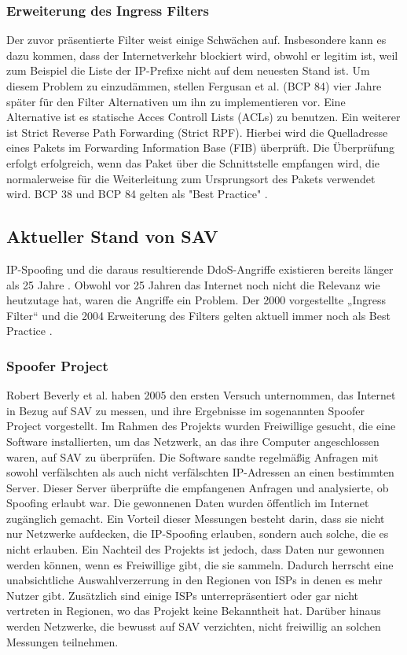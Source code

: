 \documentclass[sigplan,screen]{acmart}
\begin{document}
\subsubsection{Erweiterung des Ingress Filters}
Der zuvor präsentierte Filter weist einige Schwächen auf. Insbesondere kann es dazu kommen, dass der Internetverkehr blockiert wird, obwohl er legitim ist, weil zum Beispiel die Liste der IP-Prefixe nicht auf dem neuesten Stand ist. Um diesem Problem zu einzudämmen, stellen Fergusan et al. (BCP 84) \cite{Bcp84} vier Jahre später für den Filter Alternativen um ihn zu implementieren vor. Eine Alternative ist es statische Acces Controll Lists (ACLs) zu benutzen. Ein weiterer ist Strict Reverse Path Forwarding (Strict RPF). Hierbei wird die Quelladresse eines Pakets im Forwarding Information Base (FIB) überprüft. Die Überprüfung erfolgt erfolgreich, wenn das Paket über die Schnittstelle empfangen wird, die normalerweise für die Weiterleitung zum Ursprungsort des Pakets verwendet wird. BCP 38 und BCP 84 gelten als "Best Practice" \cite{Hal01}.

\subsection{Aktueller Stand von SAV}
IP-Spoofing und die daraus resultierende DdoS-Angriffe existieren bereits länger als 25 Jahre \cite{manrs01}. Obwohl vor 25 Jahren das Internet noch nicht die Relevanz wie heutzutage hat, waren die Angriffe ein Problem. Der 2000 vorgestellte „Ingress Filter“ \cite{Ingress01} und die 2004 Erweiterung des Filters \cite{Bcp84} gelten aktuell immer noch als Best Practice \cite{CRP01} \cite{Lone01} \cite{Hal01} \cite{manrs01}.  

\subsubsection{Spoofer Project}
Robert Beverly et al. \cite{Spoofer01} haben 2005 den ersten Versuch unternommen, das Internet in Bezug auf SAV zu messen, und ihre Ergebnisse im sogenannten Spoofer Project vorgestellt. Im Rahmen des Projekts wurden Freiwillige gesucht, die eine Software installierten, um das Netzwerk, an das ihre Computer angeschlossen waren, auf SAV zu überprüfen. Die Software sandte regelmäßig Anfragen mit sowohl verfälschten als auch nicht verfälschten IP-Adressen an einen bestimmten Server. Dieser Server überprüfte die empfangenen Anfragen und analysierte, ob Spoofing erlaubt war. Die gewonnenen Daten wurden öffentlich im Internet zugänglich gemacht. Ein Vorteil dieser Messungen besteht darin, dass sie nicht nur Netzwerke aufdecken, die IP-Spoofing erlauben, sondern auch solche, die es nicht erlauben. Ein Nachteil des Projekts ist jedoch, dass Daten nur gewonnen werden können, wenn es Freiwillige gibt, die sie sammeln. Dadurch herrscht eine unabsichtliche Auswahlverzerrung in den Regionen von ISPs in denen es mehr Nutzer gibt. Zusätzlich sind einige ISPs unterrepräsentiert oder gar nicht vertreten in Regionen, wo das Projekt keine Bekanntheit hat. Darüber hinaus werden Netzwerke, die bewusst auf SAV verzichten, nicht freiwillig an solchen Messungen teilnehmen.
\end{document}
